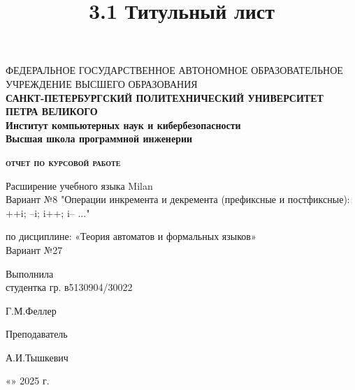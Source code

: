 \documentclass[a4paper,14pt]{article}
\title{3.1 Титульный лист}
\begin{document}
\thispagestyle{empty}    %

\begin{center}
    ФЕДЕРАЛЬНОЕ ГОСУДАРСТВЕННОЕ АВТОНОМНОЕ ОБРАЗОВАТЕЛЬНОЕ УЧРЕЖДЕНИЕ ВЫСШЕГО ОБРАЗОВАНИЯ\\
    \bfseries{САНКТ-ПЕТЕРБУРГСКИЙ ПОЛИТЕХНИЧЕСКИЙ УНИВЕРСИТЕТ ПЕТРА ВЕЛИКОГО}\\
    Институт компьютерных наук и кибербезопасности\\
    Высшая школа программной инженерии
\end{center}

\vspace{20ex} %

\begin{center}
    \begin{huge} {\bfseries{\scshape отчет по курсовой работе}} \end{huge}

    \vspace{3ex}
    Расширение учебного языка Milan\\
    Вариант №8 "Операции инкремента и декремента (префиксные и постфиксные): ++i; --i; i++; i-- ..."

    \vspace{2ex}
    по дисциплине: «Теория автоматов и формальных языков»\\
    Вариант №27
\end{center}

\vspace{30ex}

\noindent Выполнила\\
студентка гр. в5130904/30022\hfill \begin{minipage}{0.6\textwidth} \hfill Г.М.Феллер\end{minipage}

\vspace{3ex}

\noindent Преподаватель \hfill \begin{minipage} {0.6\textwidth}\hfill А.И.Тышкевич\end{minipage}

\vspace{3ex}

\hfill \begin{minipage}{0.6\textwidth} \hfill «\underline{\hspace{1cm}}»\underline{\hspace{3cm}} 2025 г.\end{minipage}
\end{document}
